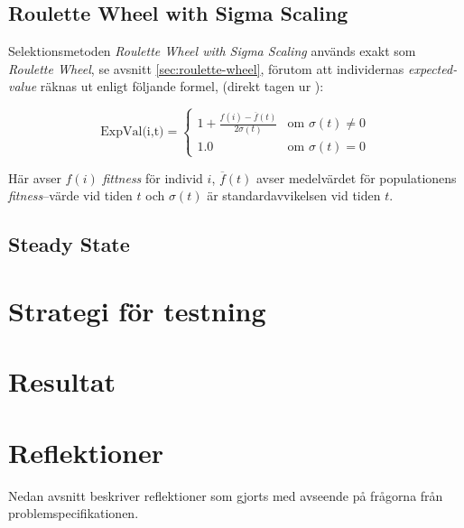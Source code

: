 \documentclass[titlepage, a4paper, 12pt]{article}
\begin{document}
\subsection{Roulette Wheel with Sigma Scaling}
Selektionsmetoden \textit{Roulette Wheel with Sigma Scaling} används
exakt som \textit{Roulette Wheel}, se avsnitt
\ref{sec:roulette-wheel}, förutom att individernas
\textit{expected-value} räknas ut enligt följande formel, (direkt
tagen ur \cite{gen-intro}):

\begin{displaymath}
  \textrm{ExpVal(i,t)} = \left\{ \begin{array}{ll}
      1 + \frac{f(i) - \overline{f}(t)}{2\sigma(t)} & \textrm{om } \sigma(t) \neq 0 \\
      1.0 & \textrm{om } \sigma(t) = 0
    \end{array} \right.
\end{displaymath}
  
Här avser $f(i)$ \textit{fittness} för individ $i$, $\overline{f}(t)$
avser medelvärdet för populationens \textit{fitness}–värde vid tiden
$t$ och $\sigma(t)$ är standardavvikelsen vid tiden $t$.


  \subsection{Steady State}
  
\section{Strategi för testning}

\section{Resultat}

\section{Reflektioner}\label{sec:reflektioner}

Nedan avsnitt beskriver reflektioner som gjorts med avseende på
frågorna från problemspecifikationen.


    
\end{document}
